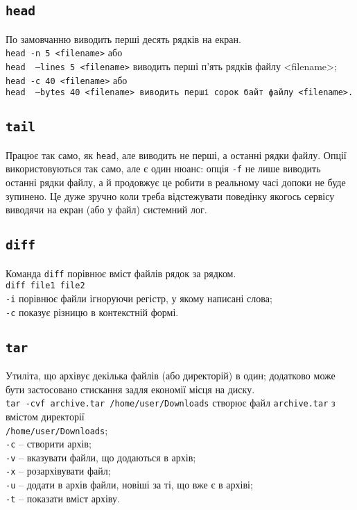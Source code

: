 \documentclass[10pt,a4paper]{fancyhandout}
\begin{document}
\subsection{\texttt{head}}
По замовчанню виводить перші десять рядків на екран. \\
\texttt{head -n 5 <filename>} або \\ \texttt{head ~---lines 5 <filename>} виводить перші п'ять рядків файлу <filename>; \\
\texttt{head -c 40 <filename>} або \\ \texttt{head ~---bytes 40 <filename> виводить перші сорок байт файлу <filename>.}
\goodbreak

\subsection{\texttt{tail}}
Працює так само, як \texttt{head}, але виводить не перші, а останні рядки файлу. Опції використовуються так само, але є один нюанс: опція \texttt{-f} не лише виводить останні рядки файлу, а й продовжує це робити в реальному часі допоки не буде зупинено. Це дуже зручно коли треба відстежувати поведінку якогось сервісу виводячи на екран (або у файл) системний лог.
\goodbreak

\subsection{\texttt{diff}}
Команда \texttt{diff} порівнює вміст файлів рядок за рядком. \\
\texttt{diff file1 file2} \\
\texttt{-i} порівнює файли ігноруючи регістр, у якому написані слова; \\
\texttt{-c} показує різницю в контекстній формі.
\goodbreak

\subsection{\texttt{tar}}
Утиліта, що архівує декілька файлів (або директорій) в один; додатково може бути застосовано стискання задля економії місця на диску. \\
\texttt{tar -cvf archive.tar /home/user/Downloads} створює файл \texttt{archive.tar} з вмістом директорії \\\texttt{/home/user/Downloads}; \\
\texttt{-c} -- створити архів; \\
\texttt{-v} -- вказувати файли, що додаються в архів; \\
\texttt{-x} -- розархівувати файл; \\
\texttt{-u} -- додати в архів файли, новіші за ті, що вже є в архіві; \\
\texttt{-t} -- показати вміст архіву.
\goodbreak
\end{document}
